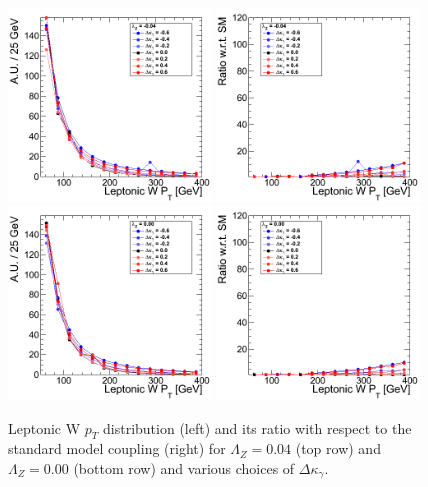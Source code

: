 \begin{figure}[h!t]
  {\centering
    \includegraphics[width=0.48\textwidth]{figs/LeptonicWpT_m004.png}
    \includegraphics[width=0.48\textwidth]{figs/LeptonicWpT_m004_ratio.png}
    \includegraphics[width=0.48\textwidth]{figs/LeptonicWpT_000.png}
    \includegraphics[width=0.48\textwidth]{figs/LeptonicWpT_000_ratio.png}
    \caption{Leptonic W $p_T$ distribution (left) and its ratio with respect to 
    the standard model coupling (right) for $\Lambda_Z = 0.04$ (top row) and 
    $\Lambda_Z = 0.00$ (bottom row)
    and various choices of $\Delta{\kappa_\gamma}$.}
    \label{fig:ww_LeptonicWpT_atgcRatio004}}
\end{figure}

